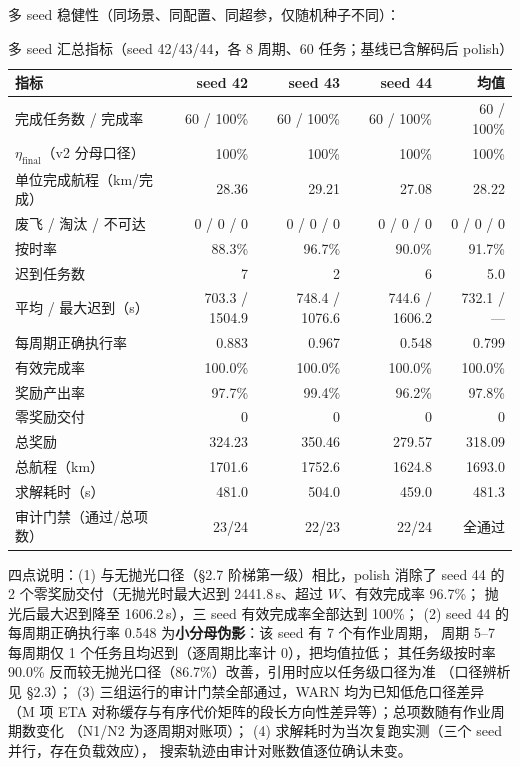 \documentclass[a4paper,11pt]{article}
\begin{document}
多 seed 稳健性（同场景、同配置、同超参，仅随机种子不同）：

\begin{table}[H]
\centering
\caption{多 seed 汇总指标（seed 42/43/44，各 8 周期、60 任务；基线已含解码后 polish）}
\label{tab:seeds}
\small
\begin{tabular}{lrrrr}
\toprule
指标 & seed 42 & seed 43 & seed 44 & 均值 \\
\midrule
完成任务数 / 完成率     & 60 / 100\% & 60 / 100\% & 60 / 100\% & 60 / 100\% \\
$\eta_{\mathrm{final}}$（v2 分母口径） & 100\% & 100\% & 100\% & 100\% \\
单位完成航程（km/完成） & 28.36 & 29.21 & 27.08 & 28.22 \\
废飞 / 淘汰 / 不可达    & 0 / 0 / 0  & 0 / 0 / 0  & 0 / 0 / 0  & 0 / 0 / 0 \\
按时率                  & 88.3\% & 96.7\% & 90.0\% & 91.7\% \\
迟到任务数              & 7 & 2 & 6 & 5.0 \\
平均 / 最大迟到（s）     & 703.3 / 1504.9 & 748.4 / 1076.6 & 744.6 / 1606.2 & 732.1 / --- \\
每周期正确执行率         & 0.883 & 0.967 & 0.548 & 0.799 \\
有效完成率              & 100.0\% & 100.0\% & 100.0\% & 100.0\% \\
奖励产出率              & 97.7\% & 99.4\% & 96.2\% & 97.8\% \\
零奖励交付              & 0 & 0 & 0 & 0 \\
总奖励                  & 324.23 & 350.46 & 279.57 & 318.09 \\
总航程（km）            & 1701.6 & 1752.6 & 1624.8 & 1693.0 \\
求解耗时（s）           & 481.0 & 504.0 & 459.0 & 481.3 \\
审计门禁（通过/总项数）   & 23/24 & 22/23 & 22/24 & 全通过 \\
\bottomrule
\end{tabular}
\end{table}

四点说明：(1) 与无抛光口径（\S 2.7 阶梯第一级）相比，polish 消除了 seed 44 的
2 个零奖励交付（无抛光时最大迟到 2441.8\,s、超过 $W$、有效完成率 96.7\%；
抛光后最大迟到降至 1606.2\,s），三 seed 有效完成率全部达到 100\%；
(2) seed 44 的每周期正确执行率 0.548 为\textbf{小分母伪影}：该 seed 有 7 个有作业周期，
周期 5--7 每周期仅 1 个任务且均迟到（逐周期比率计 0），把均值拉低；
其任务级按时率 90.0\% 反而较无抛光口径（86.7\%）改善，引用时应以任务级口径为准
（口径辨析见 \S 2.3）；
(3) 三组运行的审计门禁全部通过，WARN 均为已知低危口径差异
（M 项 ETA 对称缓存与有序代价矩阵的段长方向性差异等）；总项数随有作业周期数变化
（N1/N2 为逐周期对账项）；
(4) 求解耗时为当次复跑实测（三个 seed 并行，存在负载效应），
搜索轨迹由审计对账数值逐位确认未变。
\end{document}
